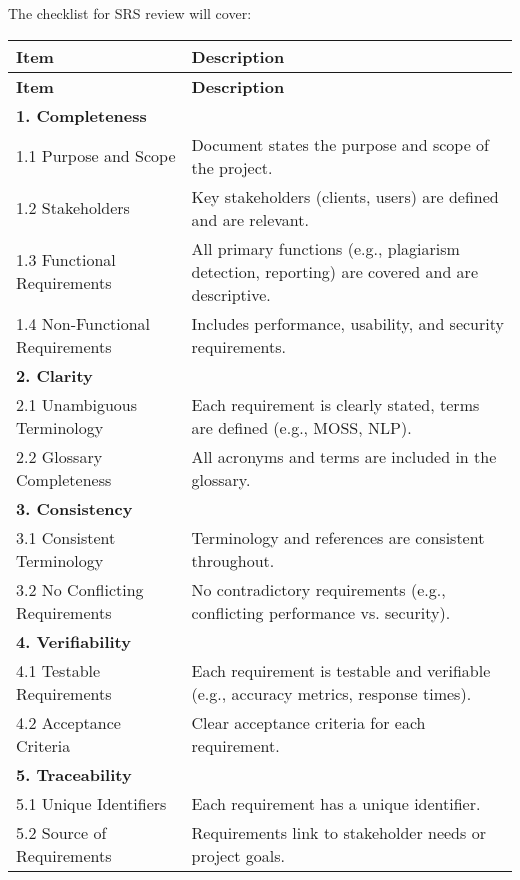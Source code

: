\documentclass[12pt, titlepage]{article}
\begin{document}
\pagebreak

The checklist for SRS review will cover:

\begin{center}
  \begin{longtable}{|p{4cm}|p{11cm}|}
  \hline
  \textbf{Item} & \textbf{Description} \\
  \hline
  \endfirsthead
  \hline
  \textbf{Item} & \textbf{Description} \\
  \hline
  \endhead
  
  \textbf{1. Completeness} & \\
  \hline
  1.1 Purpose and Scope & Document states the purpose and scope of the project. \\
  \hline
  1.2 Stakeholders & Key stakeholders (clients, users) are defined and are relevant. \\
  \hline
  1.3 Functional Requirements & All primary functions (e.g., plagiarism detection, reporting) are covered and are descriptive. \\
  \hline
  1.4 Non-Functional Requirements & Includes performance, usability, and security requirements. \\
  \hline
  \textbf{2. Clarity} & \\
  \hline
  2.1 Unambiguous Terminology & Each requirement is clearly stated, terms are defined (e.g., MOSS, NLP). \\
  \hline
  2.2 Glossary Completeness & All acronyms and terms are included in the glossary. \\
  \hline
  \textbf{3. Consistency} & \\
  \hline
  3.1 Consistent Terminology & Terminology and references are consistent throughout. \\
  \hline
  3.2 No Conflicting Requirements & No contradictory requirements (e.g., conflicting performance vs. security). \\
  \hline
  \textbf{4. Verifiability} & \\
  \hline
  4.1 Testable Requirements & Each requirement is testable and verifiable (e.g., accuracy metrics, response times). \\
  \hline
  4.2 Acceptance Criteria & Clear acceptance criteria for each requirement. \\
  \hline
  \textbf{5. Traceability} & \\
  \hline
  5.1 Unique Identifiers & Each requirement has a unique identifier. \\
  \hline
  5.2 Source of Requirements & Requirements link to stakeholder needs or project goals. \\

\end{longtable}
\end{center}
\end{document}

